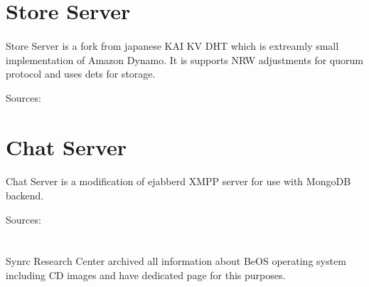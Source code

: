\documentclass[11pt]{article}
\begin{document}
\section*{Store Server}
\paragraph{}
Store Server is a fork from japanese KAI KV DHT which is
extreamly small implementation of Amazon Dynamo. It is supports 
NRW adjustments for quorum protocol and uses dets for storage.

Sources: 

\section*{Chat Server}
\paragraph{}
Chat Server is a modification of ejabberd XMPP server for use with MongoDB backend.

Sources: 

\section*{}
\paragraph{}
Synrc Research Center archived all information about BeOS operating system 
including CD images and have dedicated page for this purposes.




\@br
{}


\end{document}

